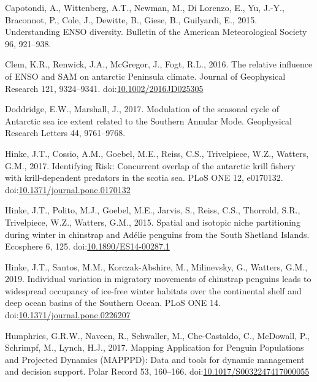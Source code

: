 \documentclass[]{elsarticle} %
\begin{document}
\leavevmode\hypertarget{ref-capotondiUnderstandingENSODiversity2015}{}%
Capotondi, A., Wittenberg, A.T., Newman, M., Di Lorenzo, E., Yu, J.-Y.,
Braconnot, P., Cole, J., Dewitte, B., Giese, B., Guilyardi, E., 2015.
Understanding ENSO diversity. Bulletin of the American Meteorological
Society 96, 921--938.

\leavevmode\hypertarget{ref-Clem2016}{}%
Clem, K.R., Renwick, J.A., McGregor, J., Fogt, R.L., 2016. The relative
influence of ENSO and SAM on antarctic Peninsula climate. Journal of
Geophysical Research 121, 9324--9341.
doi:\href{https://doi.org/10.1002/2016JD025305}{10.1002/2016JD025305}

\leavevmode\hypertarget{ref-doddridgeModulationSeasonalCycle2017}{}%
Doddridge, E.W., Marshall, J., 2017. Modulation of the seasonal cycle of
Antarctic sea ice extent related to the Southern Annular Mode.
Geophysical Research Letters 44, 9761--9768.

\leavevmode\hypertarget{ref-Hinke2017}{}%
Hinke, J.T., Cossio, A.M., Goebel, M.E., Reiss, C.S., Trivelpiece, W.Z.,
Watters, G.M., 2017. Identifying Risk: Concurrent overlap of the
antarctic krill fishery with krill-dependent predators in the scotia
sea. PLoS ONE 12, e0170132.
doi:\href{https://doi.org/10.1371/journal.pone.0170132}{10.1371/journal.pone.0170132}

\leavevmode\hypertarget{ref-Hinke2015}{}%
Hinke, J.T., Polito, M.J., Goebel, M.E., Jarvis, S., Reiss, C.S.,
Thorrold, S.R., Trivelpiece, W.Z., Watters, G.M., 2015. Spatial and
isotopic niche partitioning during winter in chinstrap and Adélie
penguins from the South Shetland Islands. Ecosphere 6, 125.
doi:\href{https://doi.org/10.1890/ES14-00287.1}{10.1890/ES14-00287.1}

\leavevmode\hypertarget{ref-Hinke2019}{}%
Hinke, J.T., Santos, M.M., Korczak-Abshire, M., Milinevsky, G., Watters,
G.M., 2019. Individual variation in migratory movements of chinstrap
penguins leads to widespread occupancy of ice-free winter habitats over
the continental shelf and deep ocean basins of the Southern Ocean. PLoS
ONE 14.
doi:\href{https://doi.org/10.1371/journal.pone.0226207}{10.1371/journal.pone.0226207}

\leavevmode\hypertarget{ref-Humphries2017}{}%
Humphries, G.R.W., Naveen, R., Schwaller, M., Che-Castaldo, C.,
McDowall, P., Schrimpf, M., Lynch, H.J., 2017. Mapping Application for
Penguin Populations and Projected Dynamics (MAPPPD): Data and tools for
dynamic management and decision support. Polar Record 53, 160--166.
doi:\href{https://doi.org/10.1017/S0032247417000055}{10.1017/S0032247417000055}
\end{document}
